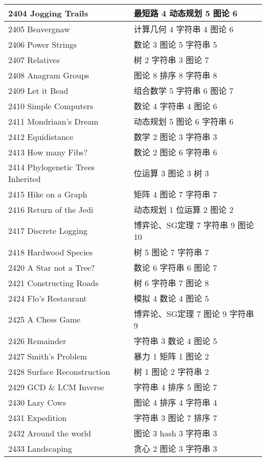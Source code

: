 \begin{longtable}{| p{} | p{} |}
 2404 Jogging Trails  & 最短路 4 动态规划 5 图论 6 \\ \hline
 2405 Beavergnaw  & 计算几何 4 字符串 4 图论 6 \\ \hline
 2406 Power Strings  & 数论 3 图论 5 字符串 5 \\ \hline
 2407 Relatives  & 树 2 字符串 3 图论 7 \\ \hline
 2408 Anagram Groups  & 图论 8 排序 8 字符串 8 \\ \hline
 2409 Let it Bead  & 组合数学 5 字符串 6 图论 7 \\ \hline
 2410 Simple Computers  & 数论 4 字符串 4 图论 6 \\ \hline
 2411 Mondriaan's Dream  & 动态规划 5 图论 6 字符串 6 \\ \hline
 2412 Equidistance  & 数学 2 图论 3 字符串 3 \\ \hline
 2413 How many Fibs?  & 数论 2 图论 6 字符串 6 \\ \hline
 2414 Phylogenetic Trees Inherited  & 位运算 3 图论 3 树 3 \\ \hline
 2415 Hike on a Graph  & 矩阵 4 图论 7 字符串 7 \\ \hline
 2416 Return of the Jedi  & 动态规划 1 位运算 2 图论 2 \\ \hline
 2417 Discrete Logging  & 博弈论、SG定理 7 字符串 9 图论 10 \\ \hline
 2418 Hardwood Species  & 树 5 图论 7 字符串 7 \\ \hline
 2420 A Star not a Tree?  & 数论 6 字符串 6 图论 7 \\ \hline
 2421 Constructing Roads  & 树 6 字符串 7 图论 8 \\ \hline
 2424 Flo's Restaurant  & 模拟 4 数论 4 图论 5 \\ \hline
 2425 A Chess Game  & 博弈论、SG定理 7 图论 9 字符串 9 \\ \hline
 2426 Remainder  & 字符串 3 数论 4 图论 5 \\ \hline
 2427 Smith's Problem  & 暴力 1 矩阵 1 图论 2 \\ \hline
 2428 Surface Reconstruction  & 树 1 图论 2 字符串 2 \\ \hline
 2429 GCD \& LCM Inverse  & 字符串 4 排序 5 图论 7 \\ \hline
 2430 Lazy Cows  & 图论 4 排序 4 字符串 4 \\ \hline
 2431 Expedition  & 字符串 3 图论 7 排序 7 \\ \hline
 2432 Around the world  & 图论 3 hash 3 字符串 3 \\ \hline
 2433 Landscaping  & 贪心 2 图论 3 字符串 3 \\ \hline

\end{longtable}
